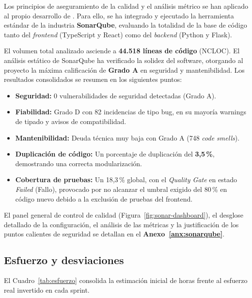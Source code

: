 Los principios de aseguramiento de la calidad y el análisis métrico se han aplicado al propio desarrollo de \dataqual. Para ello, se ha integrado y ejecutado la herramienta estándar de la industria \textbf{SonarQube}, evaluando la totalidad de la base de código tanto del \emph{frontend} (TypeScript y React) como del \emph{backend} (Python y Flask).

El volumen total analizado asciende a \textbf{44.518 líneas de código} (NCLOC). El análisis estático de SonarQube ha verificado la solidez del software, otorgando al proyecto la máxima calificación de \textbf{Grado A} en seguridad y mantenibilidad. Los resultados consolidados se resumen en los siguientes puntos:

\begin{itemize}
  \item \textbf{Seguridad:} 0 vulnerabilidades de seguridad detectadas (Grado A).
  \item \textbf{Fiabilidad:} Grado D con 82 incidencias de tipo bug, en su mayoría warnings de tipado y avisos de compatibilidad.
  \item \textbf{Mantenibilidad:} Deuda técnica muy baja con Grado A (748 \emph{code smells}).
  \item \textbf{Duplicación de código:} Un porcentaje de duplicación del \textbf{3,5\,\%}, demostrando una correcta modularización.
  \item \textbf{Cobertura de pruebas:} Un 18,3\,\% global, con el \emph{Quality Gate} en estado \emph{Failed} (Fallo), provocado por no alcanzar el umbral exigido del 80\,\% en código nuevo debido a la exclusión de pruebas del frontend.
\end{itemize}

El panel general de control de calidad (Figura~\ref{fig:sonar-dashboard}), el
desglose detallado de la configuración, el análisis de las métricas y la
justificación de los puntos calientes de seguridad se detallan en el
\textbf{Anexo~\ref{anx:sonarqube}}.

\subsection{Esfuerzo y desviaciones}
\label{sec:esfuerzo}

El Cuadro~\ref{tab:esfuerzo} consolida la estimación inicial de horas frente
al esfuerzo real invertido en cada sprint.

